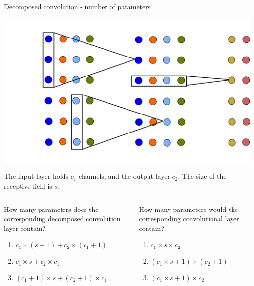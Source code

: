 \documentclass[xcolor=pdftex,dvipsnames,table,mathserif]{beamer}
\begin{document}
\begin{frame}{Decomposed convolution - number of parameters}
    \scriptsize

  \begin{center}
    \includegraphics[height=0.30\textheight]{conv_dec.png}
  \end{center}

  The input layer holds $c_1$ channels, and the output layer $c_2$. The size of the receptive field is $s$.

  \begin{columns}
  \begin{column}{.5\textwidth}

    \begin{quizzblock}{}
    How many parameters does the corresponding decomposed convolution layer contain?

\begin{enumerate}
\item $c_1 \times (s + 1) + c_2 \times (c_1 + 1)$
\item $c_1 \times s + c_2 \times c_1 $
\item $(c_1 + 1) \times s  + (c_2 + 1) \times c_1 $
\end{enumerate}

    \end{quizzblock}

  \end{column}

  \begin{column}{.5\textwidth}

    \begin{quizzblock}{}
How many parameters would the corresponding convolutional layer contain?

\begin{enumerate}
\item $c_1 \times s  \times c_2$
\item $(c_1 \times s + 1) \times (c_2 + 1)$
\item $(c_1 \times s + 1) \times c_2$
\end{enumerate}

    \end{quizzblock}

  \end{column}
\end{columns}



\end{frame}
\end{document}
